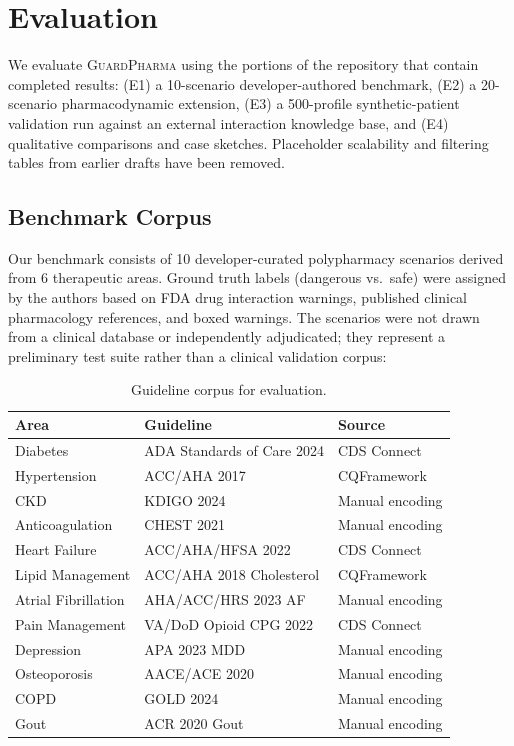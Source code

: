 \documentclass{article}
\theoremstyle{definition}
\begin{document}
\section{Evaluation}
\label{sec:eval}

We evaluate \textsc{GuardPharma} using the portions of the repository that contain completed results: (E1) a 10-scenario developer-authored benchmark, (E2) a 20-scenario pharmacodynamic extension, (E3) a 500-profile synthetic-patient validation run against an external interaction knowledge base, and (E4) qualitative comparisons and case sketches. Placeholder scalability and filtering tables from earlier drafts have been removed.

\subsection{Benchmark Corpus}

Our benchmark consists of 10 developer-curated polypharmacy scenarios derived from 6 therapeutic areas. Ground truth labels (dangerous vs.\ safe) were assigned by the authors based on FDA drug interaction warnings, published clinical pharmacology references, and boxed warnings. The scenarios were not drawn from a clinical database or independently adjudicated; they represent a preliminary test suite rather than a clinical validation corpus:

\begin{table}[H]
\centering
\caption{Guideline corpus for evaluation.}
\label{tab:corpus}
\begin{tabular}{@{}lll@{}}
\toprule
\textbf{Area} & \textbf{Guideline} & \textbf{Source} \\
\midrule
Diabetes & ADA Standards of Care 2024 & CDS Connect \\
Hypertension & ACC/AHA 2017 & CQFramework \\
CKD & KDIGO 2024 & Manual encoding \\
Anticoagulation & CHEST 2021 & Manual encoding \\
Heart Failure & ACC/AHA/HFSA 2022 & CDS Connect \\
Lipid Management & ACC/AHA 2018 Cholesterol & CQFramework \\
Atrial Fibrillation & AHA/ACC/HRS 2023 AF & Manual encoding \\
Pain Management & VA/DoD Opioid CPG 2022 & CDS Connect \\
Depression & APA 2023 MDD & Manual encoding \\
Osteoporosis & AACE/ACE 2020 & Manual encoding \\
COPD & GOLD 2024 & Manual encoding \\
Gout & ACR 2020 Gout & Manual encoding \\
\bottomrule
\end{tabular}
\end{table}
\end{document}
